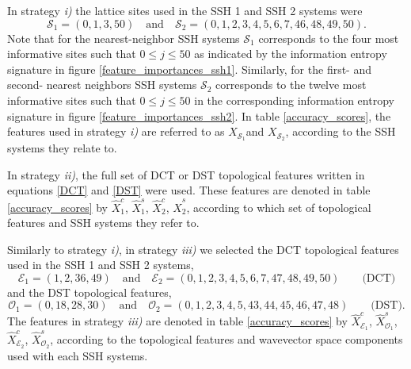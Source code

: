 \documentclass[10pt]{revtex4-1}
\newcommand\xSOne{$X_{\mathcal{S}_1}$}
\newcommand\xcOne{$\hat{X}^c_1$}
\newcommand\xcEOne{$\hat{X}^c_{\mathcal{E}_1}$}
\newcommand\xsOne{$\hat{X}^s_1$}
\newcommand\xsOOne{$\hat{X}^s_{\mathcal{O}_1}$}
\newcommand\xSTwo{$X_{\mathcal{S}_2}$}
\newcommand\xcTwo{$\hat{X}^c_2$}
\newcommand\xcETwo{$\hat{X}^c_{\mathcal{E}_2}$}
\newcommand\xsTwo{$\hat{X}^s_2$}
\newcommand\xsOTwo{$\hat{X}^s_{\mathcal{O}_2}$}
\begin{document}
In strategy \emph{i)} the lattice sites used in the SSH 1 and SSH 2 systems were
\begin{equation}
\label{lattice_subsets}
\mathcal{S}_1 = (0, 1, 3, 50 ) \quad \text{and} \quad  \mathcal{S}_2 =(0, 1, 2, 3, 4, 5, 6, 7, 46, 48, 49, 50).   
\end{equation}
Note that for the nearest-neighbor SSH systems $\mathcal{S}_1$ corresponds to the four most informative sites such that $0\leq j \leq 50$ as indicated by the information entropy signature in figure \ref{feature_importances_ssh1}. Similarly, for the first- and second- nearest neighbors SSH systems $\mathcal{S}_2$ corresponds to the twelve most informative sites such that $0\leq j \leq 50$ in the corresponding information entropy signature in figure \ref{feature_importances_ssh2}. In table \ref{accuracy_scores}, the features used in strategy \emph{i)} are referred to as \xSOne and \xSTwo, according to the SSH systems they relate to.  

In strategy \emph{ii)}, the full set of DCT or DST topological features written in equations \eqref{DCT} and \eqref{DST} were used. These features are denoted in table \ref{accuracy_scores} by \xcOne, \xsOne, \xcTwo, \xsTwo, according to which set of topological features and SSH systems they refer to. 

Similarly to strategy \emph{i)}, in strategy \emph{iii)} we selected the DCT topological features used in the SSH 1 and SSH 2 systems,
\begin{equation}
\label{DCT_subsets}
\mathcal{E}_1 = (1, 2, 36, 49) \quad \text{and} \quad  \mathcal{E}_2 =(0, 1, 2, 3, 4, 5, 6, 7, 47, 48, 49, 50) \qquad \text{(DCT)}  
\end{equation}
and the DST topological features,
\begin{equation}
\label{DST_subsets}
\mathcal{O}_1 =  (0, 18, 28, 30) \quad \text{and} \quad  \mathcal{O}_2 = (0, 1, 2, 3, 4, 5, 43, 44, 45, 46, 47, 48) \qquad \text{(DST)}.  
\end{equation}
The features in strategy \emph{iii)} are denoted in table \ref{accuracy_scores} by \xcEOne, \xsOOne, \xcETwo, \xsOTwo,   according to the topological features and wavevector space components used with each SSH systems. 
\end{document}
